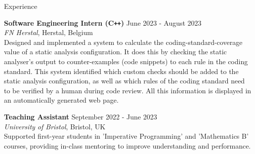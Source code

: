 \documentclass{resume} %
\begin{document}

\begin{rSection}{Experience}

\textbf{Software Engineering Intern (C\texttt{++})} \hfill June 2023 - August 2023 \\
\textit{FN Herstal}, Herstal, Belgium \\
Designed and implemented a system to calculate the coding-standard-coverage value of a static analysis configuration. It does this by checking the static analyser's output to counter-examples (code snippets) to each rule in the coding standard. This system identified which custom checks should be added to the static analysis configuration, as well as which rules of the coding standard need to be verified by a human during code review. All this information is displayed in an automatically generated web page.

\textbf{Teaching Assistant} \hfill September 2022 - June 2023 \\
\textit{University of Bristol}, Bristol, UK \\
Supported first-year students in 'Imperative Programming' and 'Mathematics B' courses, providing in-class mentoring to improve understanding and performance.

\end{rSection}

\end{document}
